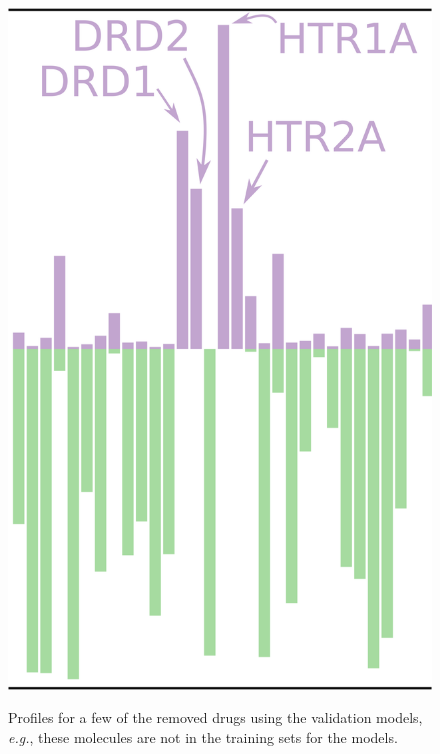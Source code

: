 \documentclass[utf8]{frontiersSCNS} %
\begin{document}
\begin{figure}
\begin{minipage}[t]{0.3\textwidth}
    \includegraphics[width=\linewidth]{figures/chembl531.png}
    \label{fig:threeprofiles:c}
\end{minipage}
\hfill
\caption{Profiles for a few of the removed drugs using the validation models,
    \textit{e.g.}, these molecules are not in the training sets for the models.
    \label{fig:threeprofiles}}
\end{figure}



\end{document}
